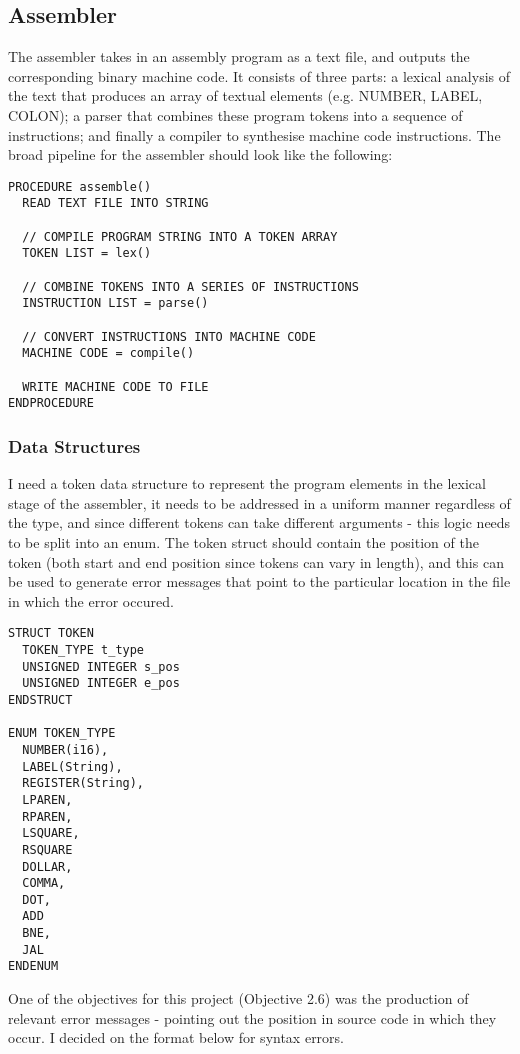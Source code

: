 \subsection{Assembler}
The assembler takes in an assembly program as a text file, and outputs the corresponding binary machine code. It consists of three parts: a lexical analysis of the text that produces an array of textual elements (e.g. NUMBER, LABEL, COLON); a parser that combines these program tokens into a sequence of instructions; and finally a compiler to synthesise machine code instructions. The broad pipeline for the assembler should look like the following:

\begin{lstlisting}
PROCEDURE assemble() 
  READ TEXT FILE INTO STRING

  // COMPILE PROGRAM STRING INTO A TOKEN ARRAY
  TOKEN LIST = lex()   

  // COMBINE TOKENS INTO A SERIES OF INSTRUCTIONS
  INSTRUCTION LIST = parse()   

  // CONVERT INSTRUCTIONS INTO MACHINE CODE
  MACHINE CODE = compile() 

  WRITE MACHINE CODE TO FILE
ENDPROCEDURE
\end{lstlisting}

\subsubsection{Data Structures}

I need a token data structure to represent the program elements in the lexical stage of the assembler, it needs to be addressed in a uniform manner regardless of the type, and since different tokens can take different arguments - this logic needs to be split into an enum. The token struct should contain the position of the token (both start and end position since tokens can vary in length), and this can be used to generate error messages that point to the particular location in the file in which the error occured. 

\begin{lstlisting}
STRUCT TOKEN 
  TOKEN_TYPE t_type
  UNSIGNED INTEGER s_pos 
  UNSIGNED INTEGER e_pos 
ENDSTRUCT 

ENUM TOKEN_TYPE
  NUMBER(i16),
  LABEL(String),
  REGISTER(String),
  LPAREN,
  RPAREN,
  LSQUARE,
  RSQUARE
  DOLLAR,
  COMMA,
  DOT,
  ADD 
  BNE, 
  JAL
ENDENUM
\end{lstlisting}

One of the objectives for this project (Objective 2.6) was the production of relevant error messages - pointing out the position in source code in which they occur. I decided on the format below for syntax errors. 

